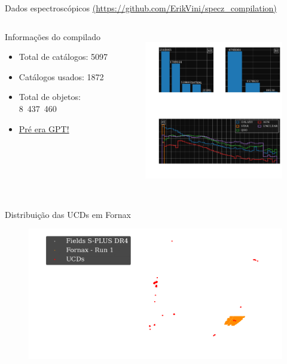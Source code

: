 \begin{frame}{Dados espectroscópicos {\small \textcolor{gray}{\url{(https://github.com/ErikVini/specz_compilation)}}}}
    \begin{columns}[c]
        \hspace{0.5cm}
        \begin{column}{0.40\textwidth}
            \begin{splusbox}{Informações do compilado}
                \begin{itemize}
                    \item Total de catálogos: 5097
                    \item Catálogos usados: 1872
                    \item Total de objetos: \mbox{8 437 460}
                    \item \underline{Pré era GPT!}
                \end{itemize}
            \end{splusbox}
        \end{column}
        \begin{column}{0.50\textwidth}
            \begin{figure}
                \centering
                \includegraphics[height=7cm]{script/images/specz_distributions.pdf}
            \end{figure}
        \end{column}
    \end{columns}
\end{frame}

\begin{frame}[c]{Distribuição das UCDs em Fornax}
    \begin{figure}
        \centering
        \includegraphics[width=0.8\linewidth, keepaspectratio]{images/ucds_sky.png}
    \end{figure}
\end{frame}

